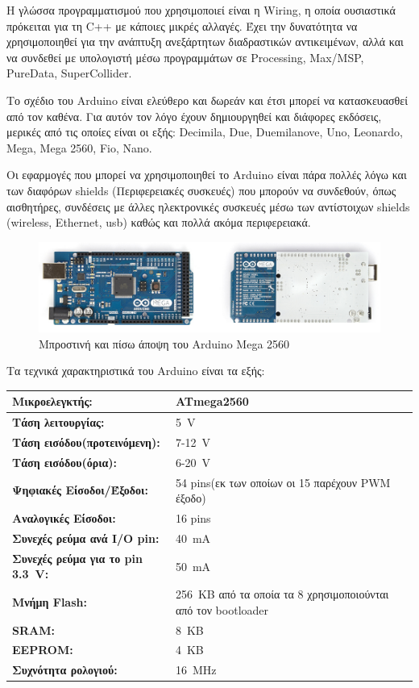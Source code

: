 \documentclass[12pt, a4paper, oneside]{report}
\begin{document}
Η γλώσσα προγραμματισμού που χρησιμοποιεί είναι η Wiring, η οποία ουσιαστικά πρόκειται για τη C++ με κάποιες μικρές αλλαγές. Έχει την δυνατότητα να χρησιμοποιηθεί για την ανάπτυξη ανεξάρτητων διαδραστικών αντικειμένων, αλλά και να συνδεθεί με υπολογιστή μέσω προγραμμάτων σε Processing, Max\slash MSP, PureData, SuperCollider.

Το σχέδιο του Arduino είναι ελεύθερο και δωρεάν και έτσι μπορεί να κατασκευασθεί από τον καθένα. Για αυτόν τον λόγο έχουν δημιουργηθεί και διάφορες εκδόσεις, μερικές από τις οποίες είναι οι εξής: Decimila, Due, Duemilanove, Uno, Leonardo, Mega, Mega 2560, Fio, Nano.

Οι εφαρμογές που μπορεί να χρησιμοποιηθεί το Arduino είναι πάρα πολλές λόγω και των διαφόρων shields (Περιφερειακές συσκευές) που μπορούν να συνδεθούν, όπως αισθητήρες, συνδέσεις με άλλες ηλεκτρονικές συσκευές μέσω των αντίστοιχων shields (wireless, Ethernet, usb) καθώς και πολλά ακόμα περιφερειακά.
\clearpage
\begin{figure}[!htb]
\centering
\includegraphics[width=\textwidth]{img_arduino}
\caption[Μπροστινή και πίσω άποψη του Arduino Mega 2560]{Μπροστινή και πίσω άποψη του Arduino Mega 2560\cite{arduino}}
\end{figure}

Τα τεχνικά χαρακτηριστικά του Arduino είναι τα εξής:

\begin{table}[!hb]
\centering
{\renewcommand{\arraystretch}{1.5}
\renewcommand{\tabcolsep}{0.2cm}
\footnotesize
\begin{tabular}{L{0.4\textwidth} L{0.6\textwidth}}
\hline
\textbf{Μικροελεγκτής:} & ATmega2560\\ \hline
\textbf{Τάση λειτουργίας:} & 5~V\\ \hline
\textbf{Τάση εισόδου(προτεινόμενη):} & 7-12~V\\ \hline
\textbf{Τάση εισόδου(όρια):} & 6-20~V\\ \hline
\textbf{Ψηφιακές Είσοδοι\slash Έξοδοι:} & 54 pins(εκ των οποίων οι 15 παρέχουν PWM έξοδο)\\ \hline
\textbf{Αναλογικές Είσοδοι:} & 16 pins\\ \hline
\textbf{Συνεχές ρεύμα ανά I\slash O pin:} & 40~mA\\ \hline
\textbf{Συνεχές ρεύμα για το pin 3.3~V:} & 50~mA\\ \hline
\textbf{Μνήμη Flash:} & 256~KB από τα οποία τα 8 χρησιμοποιούνται από τον bootloader\\ \hline
\textbf{SRAM:} & 8~KB\\ \hline
\textbf{EEPROM:} & 4~KB\\ \hline
\textbf{Συχνότητα ρολογιού:} & 16~MHz\\ \hline
\end{tabular}
}
\end{table}
\end{document}
